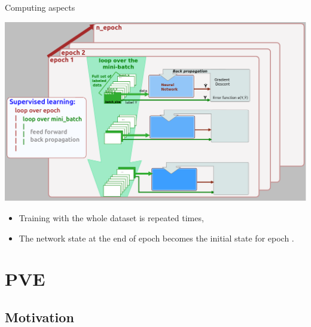 \documentclass[10pt,serif,mathserif,compress,hyperref={colorlinks}]{beamer}
\begin{document}
\begin{frame}{Computing aspects}

  \includegraphics[width=\textwidth]{./images/NetworkTraining_2.png}
  \vspace*{-3mm}\begin{itemize}
  \item Training with the whole dataset is repeated  times,
  \item The network state at the end of epoch  becomes the initial state for epoch .
   \end{itemize}  
\end{frame}

\section{PVE}

\subsection{Motivation}
\end{document}
